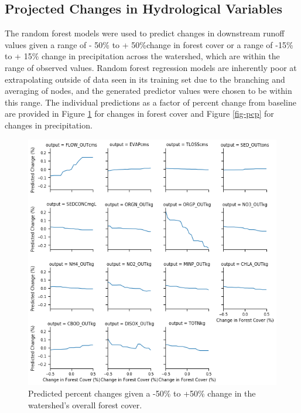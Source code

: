 \documentclass[runningheads]{llncs}
\begin{document}
\subsection{Projected Changes in Hydrological Variables}
The random forest models were used to predict changes in downstream runoff values given a range of - 50\% to + 50\%change in forest cover or a range of -15\% to + 15\% change in precipitation across the watershed, which are within the range of observed values.
Random forest regression models are inherently poor at extrapolating outside of data seen in its training set due to the branching and averaging of nodes, and the generated predictor values were chosen to be within this range.
The individual predictions as a factor of percent change from baseline are provided in Figure \ref{fig-fc} for changes in forest cover and Figure \ref{fig-pcp} for changes in precipitation.

\begin{figure}[h]
\begin{center}
%
  \includegraphics[width=\linewidth]{images/predictions_forest_facetgrid.png}
\endminipage
\caption{Predicted percent changes given a -50\% to +50\% change in the watershed's overall forest cover.} \label{fig-fc}
\end{center}
\end{figure}
\end{document}
